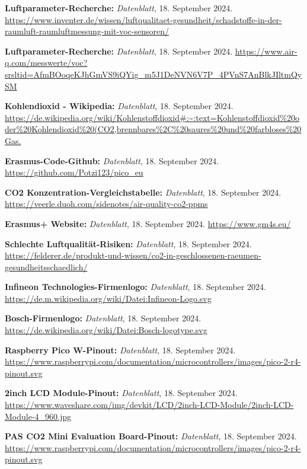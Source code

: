 \begin{thebibliography}{9999}
\textbf{Luftparameter-Recherche:} \textit{Datenblatt}, 18. September 2024.  
\url{https://www.inventer.de/wissen/luftqualitaet-gesundheit/schadstoffe-in-der-raumluft-raumluftmessung-mit-voc-sensoren/}

\textbf{Luftparameter-Recherche:} \textit{Datenblatt}, 18. September 2024.  
\url{https://www.air-q.com/messwerte/voc?srsltid=AfmBOoqeKJhGmVS9iQYig_m5J1DeNVN6V7P_4PVnS7AnBlkJIltmQySM}

\textbf{Kohlendioxid - Wikipedia:} \textit{Datenblatt}, 18. September 2024.  
\url{https://de.wikipedia.org/wiki/Kohlenstoffdioxid#:~:text=Kohlenstoffdioxid%20oder%20Kohlendioxid%20(CO2,brennbares%2C%20saures%20und%20farbloses%20Gas.}

\textbf{Erasmus-Code-Github:} \textit{Datenblatt}, 18. September 2024.  
\url{https://github.com/Potzi123/pico_eu}

\textbf{CO2 Konzentration-Vergleichstabelle:} \textit{Datenblatt}, 18. September 2024.  
\url{https://veerle.duoh.com/sidenotes/air-quality-co2-ppms}

\textbf{Erasmus+ Website:} \textit{Datenblatt}, 18. September 2024.  
\url{https://www.gm4s.eu/}

\textbf{Schlechte Luftqualität-Risiken:} \textit{Datenblatt}, 18. September 2024.  
\url{https://felderer.de/produkt-und-wissen/co2-in-geschlossenen-raeumen-gesundheitsschaedlich/}

\textbf{Infineon Technologies-Firmenlogo:} \textit{Datenblatt}, 18. September 2024.  
\url{https://de.m.wikipedia.org/wiki/Datei:Infineon-Logo.svg}

\textbf{Bosch-Firmenlogo:} \textit{Datenblatt}, 18. September 2024.  
\url{https://de.wikipedia.org/wiki/Datei:Bosch-logotype.svg}

\textbf{Raspberry Pico W-Pinout:} \textit{Datenblatt}, 18. September 2024.  
\url{https://www.raspberrypi.com/documentation/microcontrollers/images/pico-2-r4-pinout.svg}

\textbf{2inch LCD Module-Pinout:} \textit{Datenblatt}, 18. September 2024.  
\url{https://www.waveshare.com/img/devkit/LCD/2inch-LCD-Module/2inch-LCD-Module-4_960.jpg}

\textbf{PAS CO2 Mini Evaluation Board-Pinout:} \textit{Datenblatt}, 18. September 2024.  
\url{https://www.raspberrypi.com/documentation/microcontrollers/images/pico-2-r4-pinout.svg}


\end{thebibliography}
